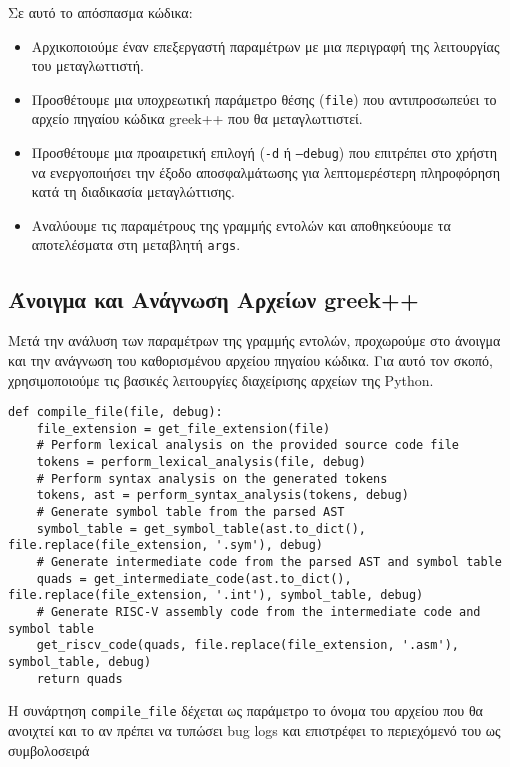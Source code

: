 \documentclass[12pt,a4paper]{article}
\begin{document}
Σε αυτό το απόσπασμα κώδικα:
\begin{itemize}
    \item Αρχικοποιούμε έναν επεξεργαστή παραμέτρων με μια περιγραφή της λειτουργίας του μεταγλωττιστή.
    \item Προσθέτουμε μια υποχρεωτική παράμετρο θέσης (\texttt{file}) που αντιπροσωπεύει το αρχείο πηγαίου κώδικα greek++ που θα μεταγλωττιστεί.
    \item Προσθέτουμε μια προαιρετική επιλογή (\texttt{-d} ή \texttt{--debug}) που επιτρέπει στο χρήστη να ενεργοποιήσει την έξοδο αποσφαλμάτωσης για λεπτομερέστερη πληροφόρηση κατά τη διαδικασία μεταγλώττισης.
    \item Αναλύουμε τις παραμέτρους της γραμμής εντολών και αποθηκεύουμε τα αποτελέσματα στη μεταβλητή \texttt{args}.
\end{itemize}

\subsection{Άνοιγμα και Ανάγνωση Αρχείων greek++}

Μετά την ανάλυση των παραμέτρων της γραμμής εντολών, προχωρούμε στο άνοιγμα και την ανάγνωση του καθορισμένου αρχείου πηγαίου κώδικα. Για αυτό τον σκοπό, χρησιμοποιούμε τις βασικές λειτουργίες διαχείρισης αρχείων της Python.

\begin{verbatim}
def compile_file(file, debug):
    file_extension = get_file_extension(file)
    # Perform lexical analysis on the provided source code file
    tokens = perform_lexical_analysis(file, debug)
    # Perform syntax analysis on the generated tokens
    tokens, ast = perform_syntax_analysis(tokens, debug)
    # Generate symbol table from the parsed AST
    symbol_table = get_symbol_table(ast.to_dict(), file.replace(file_extension, '.sym'), debug)
    # Generate intermediate code from the parsed AST and symbol table
    quads = get_intermediate_code(ast.to_dict(), file.replace(file_extension, '.int'), symbol_table, debug)
    # Generate RISC-V assembly code from the intermediate code and symbol table
    get_riscv_code(quads, file.replace(file_extension, '.asm'), symbol_table, debug)
    return quads
\end{verbatim}

Η συνάρτηση \texttt{compile\_file} δέχεται ως παράμετρο το όνομα του αρχείου που θα ανοιχτεί και το αν πρέπει να τυπώσει bug logs και επιστρέφει το περιεχόμενό του ως συμβολοσειρά
\end{document}
